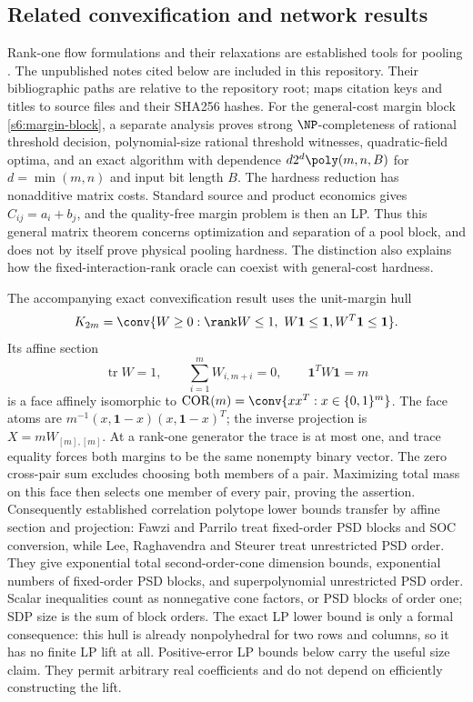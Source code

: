 \subsection{Related convexification and network results}\label{s6:related}
Rank-one flow formulations and their relaxations are established tools
for pooling \cite{dey2020-convexifications-of-rank-one-based,gupte2017-relaxations-and-discretizations-for-the}.
The unpublished notes cited below are included in this repository. Their
bibliographic paths are relative to the repository root;
 maps citation keys and titles to
source files and their SHA256 hashes.
For the general-cost margin block \eqref{s6:margin-block}, a separate
analysis \cite{s6:margin-note} proves strong $\NP$-completeness of
rational threshold decision, polynomial-size rational threshold witnesses,
quadratic-field optima, and an exact algorithm with dependence
$d2^d\poly(m,n,B)$ for $d=\min(m,n)$ and input bit length $B$.
The hardness reduction has nonadditive matrix costs. Standard source
and product economics gives $C_{ij}=a_i+b_j$, and the quality-free
margin problem is then an LP. Thus this general matrix theorem concerns
optimization and separation of a pool block, and does not by itself
prove physical pooling hardness. The distinction also explains how the
fixed-interaction-rank oracle can coexist with general-cost hardness.

The accompanying exact convexification result \cite{s6:face-note}
uses the unit-margin hull
\[
 K_{2m}=\conv\{W\ge0:\rank W\le1,\ W\mathbf1\le\mathbf1,
 W^T\mathbf1\le\mathbf1\}.
\]
Its affine section
\[
 \operatorname{tr}W=1,\qquad\sum_{i=1}^mW_{i,m+i}=0,
 \qquad\mathbf1^TW\mathbf1=m
\]
is a face affinely isomorphic to
$\operatorname{COR}(m)=\conv\{xx^T:x\in\{0,1\}^m\}$.
The face atoms are
$m^{-1}(x,\mathbf1-x)(x,\mathbf1-x)^T$; the inverse projection is
$X=mW_{[m],[m]}$. At a rank-one generator the trace is at most one,
and trace equality forces both margins to be the same nonempty binary
vector. The zero cross-pair sum excludes choosing both members of a
pair. Maximizing total mass on this face then selects one member of
every pair, proving the assertion. Consequently established correlation
polytope lower bounds transfer by affine section and projection:
Fawzi and Parrilo \cite[Theorem~1]{s6:fawzi2013} treat fixed-order PSD
blocks and SOC conversion, while Lee, Raghavendra and Steurer
\cite[Theorem~1.1]{s6:lrs-full} treat unrestricted PSD order.
They give exponential total second-order-cone dimension bounds,
exponential numbers of fixed-order PSD blocks, and superpolynomial
unrestricted PSD order. Scalar inequalities count as nonnegative cone
factors, or PSD blocks of order one; SDP size is the sum of block orders.
The exact LP lower bound is only a formal consequence: this hull is
already nonpolyhedral for two rows and columns, so it has no finite LP
lift at all. Positive-error LP bounds below carry the useful size claim. They permit arbitrary real coefficients and do not depend
on efficiently constructing the lift.

